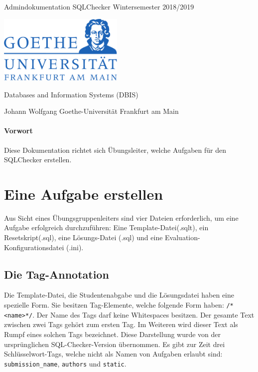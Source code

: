 \documentclass[11pt]{article}
\begin{document}
 \hypersetup{pageanchor=false}
\begin{titlepage}
	\begin{center}
		
		\vspace{6cm}
		
		{\huge Admindokumentation SQLChecker}
		{\small Wintersemester 2018/2019}
		\vspace{0.2cm}
		
		
		
		\vspace{2cm}
		\includegraphics[width=6cm]{title/goethe}
		\vspace{2.5cm}
		
		Databases and Information Systems (DBIS)
		
		Johann Wolfgang Goethe-Universität Frankfurt am Main
		
		
	\end{center}
	
\end{titlepage}
 \hypersetup{pageanchor=true}
 
\tableofcontents
 \newpage
\paragraph{Vorwort}
Diese Dokumentation richtet sich Übungsleiter, welche Aufgaben für den SQLChecker erstellen.

\section{Eine Aufgabe erstellen}
Aus Sicht eines Übungsgruppenleiters sind vier Dateien erforderlich, um eine Aufgabe erfolgreich durchzuführen: Eine Template-Datei(.sqlt), ein Resetskript(.sql), eine Lösungs-Datei (.sql) und eine Evaluation-Konfigurationsdatei (.ini). 

\subsection{Die Tag-Annotation}
Die Template-Datei, die Studentenabgabe und die Lösungsdatei haben eine spezielle Form. Sie besitzen Tag-Elemente, welche folgende Form haben: \texttt{/*<name>*/}. Der Name des Tags darf keine Whitespaces besitzen. Der gesamte Text zwischen zwei Tags gehört zum ersten Tag. Im Weiteren wird dieser Text als Rumpf eines solchen Tags bezeichnet. Diese Darstellung wurde von der ursprünglichen SQL-Checker-Version übernommen. Es gibt zur Zeit drei Schlüsselwort-Tags, welche nicht als Namen von Aufgaben erlaubt sind: \texttt{submission\_name}, \texttt{authors} und \texttt{static}.
\end{document}
